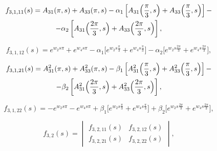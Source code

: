 
\begin{multline}

f_{3,1,11}(s)=A_{31}(\pi,s)+A_{33}(\pi,s)-\alpha_1\left[A_{31}\Bigl(\frac\pi3,s\Bigr)+

A_{33}\Bigl(\frac\pi3,s\Bigr)\right] -\\-\alpha_2 \left[A_{31}\Bigl(\frac{2\pi}3,s\Bigr)+A_{33}

\Bigl(\frac{2\pi}3,s\Bigr)\right],

\end{multline}

$$

f_{3,1,12}(s)=e^{w_2s\pi}+e^{w_4s\pi}-\alpha_1\Big[e^{w_2s\frac\pi3}+

e^{w_4s\frac\pi3}\Big]-\alpha_2

\Big[e^{w_2s\frac{2\pi}3}+e^{w_4s\frac{2\pi}3}\Big],

$$

\begin{multline}

f_{3,1,21}(s)=A^2_{31}(\pi,s)+A^2_{33}(\pi,s)-\beta_1\left[A^2_{31}\Bigl(\frac\pi3,s\Bigr)+

A^2_{33}\Bigl(\frac\pi3,s\Bigr)\right] -\\-\beta_2 \left[A^2_{31}\Bigl(\frac{2\pi}3,s\Bigr)+A^2_{33}

\Bigl(\frac{2\pi}3,s\Bigr)\right],

\end{multline}

$$

f_{3,1,22}(s)=-e^{w_2s\pi}-e^{w_4s\pi}+\beta_1\Big[e^{w_2s\frac\pi3}+

e^{w_4s\frac\pi3}\Big]+\beta_2

\Big[e^{w_2s\frac{2\pi}3}+e^{w_4s\frac{2\pi}3}\Big],

$$

\begin{equation}

\label{mitr:eq22}

f_{3,2}(s)= \begin{vmatrix}

f_{3,2,11} (s) &f_{3,2,12} (s)\\

f_{3,2,21} (s) &f_{3,2,22}(s)

\end{vmatrix},

\end{equation}


